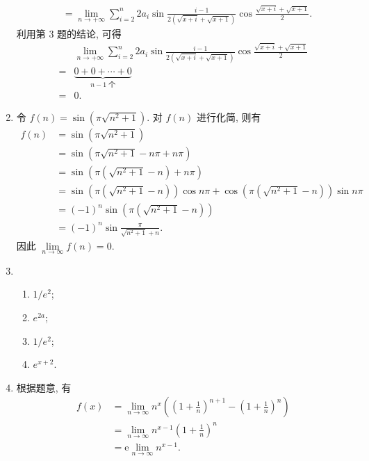 \begin{enumerate}
\begin{align*}
                                                             &= \lim_{n\to+\infty}\sum_{i=2}^n 2a_i\sin\frac{i-1}{2(\sqrt{x+i} + \sqrt{x+1})}\cos\frac{\sqrt{x+i} + \sqrt{x+1}}{2}.
        \end{align*}
        利用第 3 题的结论, 可得
        \begin{align*}
                & \lim_{n\to+\infty}\sum_{i=2}^n 2a_i\sin\frac{i-1}{2(\sqrt{x+i} + \sqrt{x+1})}\cos\frac{\sqrt{x+i} + \sqrt{x+1}}{2} \\
            ={} & \underbrace{0 + 0 + \cdots + 0}_{\text{$n-1$ 个}} \\
            ={} & 0.
        \end{align*}
    \item %
        令 $f(n) = \sin(\pi\sqrt{n^2+1})$. 对 $f(n)$ 进行化简, 则有
        \begin{align*}
            f(n) &= \sin(\pi\sqrt{n^2+1}) \\
                 &= \sin(\pi\sqrt{n^2+1} - n\pi + n\pi) \\
                 &= \sin\left(\pi(\sqrt{n^2+1} - n) + n\pi\right) \\
                 &= \sin\left(\pi(\sqrt{n^2+1} - n)\right)\cos n\pi + \cos\left(\pi(\sqrt{n^2+1} - n)\right)\sin n\pi \\
                 &= (-1)^n \sin\left(\pi(\sqrt{n^2+1} - n)\right) \\
                 &= (-1)^n \sin\frac{\pi}{\sqrt{n^2+1} + n}.
        \end{align*}
        因此 $\lim\limits_{n\to\infty}f(n) = 0$.
    \item %
        \begin{enumerate}[(1)]
            \item %
                $1/e^2$;
            \item %
                $e^{2a}$;
            \item %
                $1/e^2$;
            \item %
                $e^{x+2}$.
        \end{enumerate}
    \item %
        根据题意, 有
        \begin{align*}
            f(x) &= \lim_{n\to\infty}n^x\left(\left(1+\frac1n\right)^{n+1} - \left(1+\frac1n\right)^n\right) \\
                 &= \lim_{n\to\infty} n^{x-1} \left(1+\frac1n\right)^n \\
                 &= \mathrm{e} \lim_{n\to\infty} n^{x-1}.

\end{align*}
\end{enumerate}

